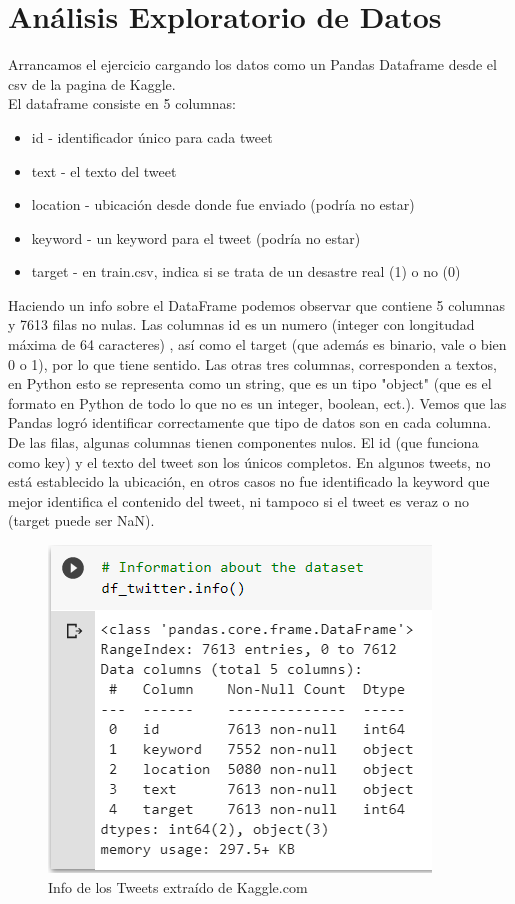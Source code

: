 \documentclass[]{article}
\begin{document}
\section{An\'alisis Exploratorio de Datos}

Arrancamos el ejercicio cargando los datos como un Pandas Dataframe desde el csv de la pagina de Kaggle. \\

El dataframe consiste en 5 columnas:
\begin{itemize}

\item id - identificador \'unico para cada tweet
\item text - el texto del tweet
\item location - ubicación desde donde fue enviado (podr\'ia no estar)
\item keyword - un keyword para el tweet  (podr\'ia no estar)
\item target - en train.csv, indica si se trata de un desastre real  (1) o no (0)
\end{itemize}
 
 Haciendo un info sobre el DataFrame podemos observar que contiene 5 columnas y 7613 filas no nulas. Las columnas id es un numero (integer con longitudad m\'axima de 64 caracteres) , as\'i como el target (que adem\'as es binario, vale o bien 0 o 1), por lo que tiene sentido. Las otras tres columnas, corresponden a textos, en Python esto se representa como un string, que es un tipo "object" (que es  el formato en Python de todo lo que no es un integer, boolean, ect.). Vemos que las Pandas logr\'o identificar correctamente que tipo de datos son en cada columna. \\
 De las filas, algunas columnas tienen componentes nulos. El id (que funciona como key) y el texto del tweet son los \'unicos completos. En algunos tweets, no est\'a establecido la ubicaci\'on, en otros casos no fue identificado la keyword que mejor identifica el contenido del tweet, ni tampoco si el tweet es veraz o no (target puede ser NaN). 
 
 \begin{figure}[H]
 	\centering
 	\includegraphics[width=0.75\linewidth]{df_twitter.info}
 	\caption[]{Info de los Tweets extra\'ido de Kaggle.com}
 \end{figure}
\end{document}
